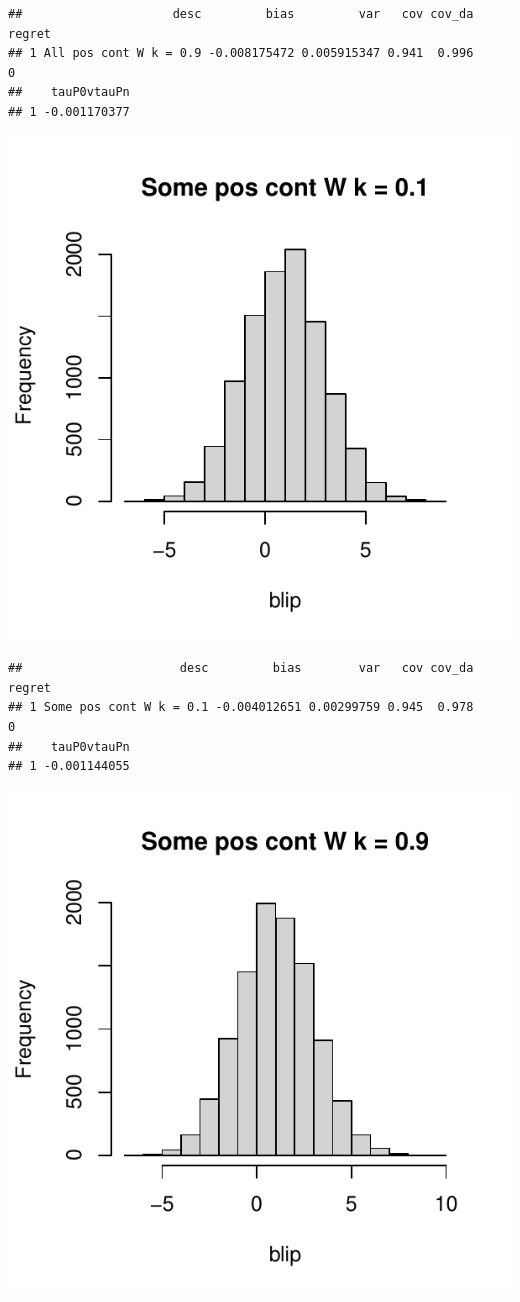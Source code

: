 \documentclass[11pt]{article}\usepackage[]{graphicx}\usepackage[table]{xcolor}
\makeatletter
\def\maxwidth{ %
  \ifdim\Gin@nat@width>\linewidth
    \linewidth
  \else
    \Gin@nat@width
  \fi
}
\newenvironment{kframe}{%
 \def\at@end@of@kframe{}%
 \ifinner\ifhmode%
  \def\at@end@of@kframe{\end{minipage}}%
  \begin{minipage}{\columnwidth}%
 \fi\fi%
 \def\FrameCommand##1{\hskip\@totalleftmargin \hskip-\fboxsep
 \colorbox{shadecolor}{##1}\hskip-\fboxsep
     \hskip-\linewidth \hskip-\@totalleftmargin \hskip\columnwidth}%
 \MakeFramed {\advance\hsize-\width
   \@totalleftmargin\z@ \linewidth\hsize
   \@setminipage}}%
 {\par\unskip\endMakeFramed%
 \at@end@of@kframe}
\newenvironment{knitrout}{}{} %
\makeatother
\begin{document}
\begin{knitrout}
\begin{kframe}\begin{verbatim}
##                     desc         bias         var   cov cov_da regret
## 1 All pos cont W k = 0.9 -0.008175472 0.005915347 0.941  0.996      0
##    tauP0vtauPn
## 1 -0.001170377
\end{verbatim}
\end{kframe}
\includegraphics[width=\maxwidth]{figure/unnamed-chunk-4-9} 
\begin{kframe}\begin{verbatim}
##                      desc         bias        var   cov cov_da regret
## 1 Some pos cont W k = 0.1 -0.004012651 0.00299759 0.945  0.978      0
##    tauP0vtauPn
## 1 -0.001144055
\end{verbatim}
\end{kframe}
\includegraphics[width=\maxwidth]{figure/unnamed-chunk-4-10} 

\end{knitrout}
\end{document}
